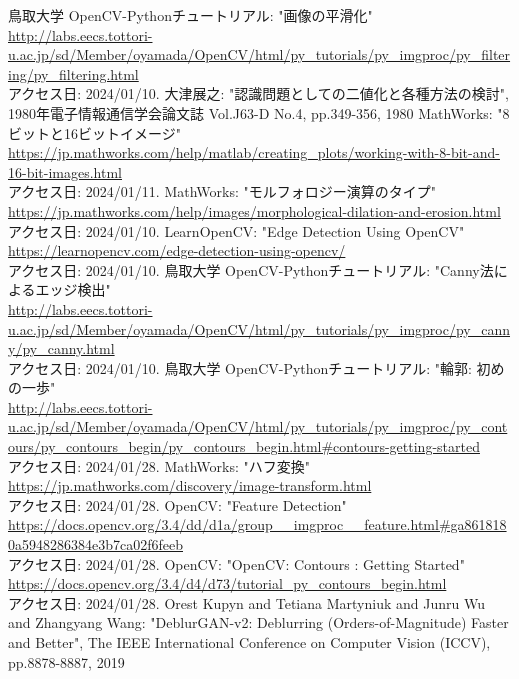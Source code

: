 \documentclass[uplatex, report, a4j, 10pt]{jsbook}
\begin{document}
\begin{thebibliography}{0}
  鳥取大学 OpenCV-Pythonチュートリアル: "画像の平滑化"\\\url{http://labs.eecs.tottori-u.ac.jp/sd/Member/oyamada/OpenCV/html/py_tutorials/py_imgproc/py_filtering/py_filtering.html}\\アクセス日: 2024/01/10.
  大津展之: "認識問題としての二値化と各種方法の検討", 1980年電子情報通信学会論文誌 Vol.J63-D No.4, pp.349-356, 1980
  MathWorks: "8ビットと16ビットイメージ"\\\url{https://jp.mathworks.com/help/matlab/creating_plots/working-with-8-bit-and-16-bit-images.html}\\アクセス日: 2024/01/11.
  MathWorks: "モルフォロジー演算のタイプ"\\\url{https://jp.mathworks.com/help/images/morphological-dilation-and-erosion.html}\\アクセス日: 2024/01/10.
  LearnOpenCV: "Edge Detection Using OpenCV"\\\url{https://learnopencv.com/edge-detection-using-opencv/}\\アクセス日: 2024/01/10.
  鳥取大学 OpenCV-Pythonチュートリアル: "Canny法によるエッジ検出"\\\url{http://labs.eecs.tottori-u.ac.jp/sd/Member/oyamada/OpenCV/html/py_tutorials/py_imgproc/py_canny/py_canny.html}\\アクセス日: 2024/01/10.
  鳥取大学 OpenCV-Pythonチュートリアル: "輪郭: 初めの一歩"\\\url{http://labs.eecs.tottori-u.ac.jp/sd/Member/oyamada/OpenCV/html/py_tutorials/py_imgproc/py_contours/py_contours_begin/py_contours_begin.html#contours-getting-started}\\アクセス日: 2024/01/28.
  MathWorks: "ハフ変換"\\\url{https://jp.mathworks.com/discovery/image-transform.html}\\アクセス日: 2024/01/28.
  OpenCV: "Feature Detection"\\\url{https://docs.opencv.org/3.4/dd/d1a/group__imgproc__feature.html#ga8618180a5948286384e3b7ca02f6feeb}\\アクセス日: 2024/01/28.
  OpenCV: "OpenCV: Contours : Getting Started"\\\url{https://docs.opencv.org/3.4/d4/d73/tutorial_py_contours_begin.html}\\アクセス日: 2024/01/28.
  Orest Kupyn and Tetiana Martyniuk and Junru Wu and Zhangyang Wang: "DeblurGAN-v2: Deblurring (Orders-of-Magnitude) Faster and Better", The IEEE International Conference on Computer Vision (ICCV), pp.8878-8887, 2019

\end{thebibliography}
\end{document}

